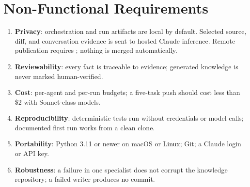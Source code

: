 \section{Non-Functional Requirements}

\begin{enumerate}[label=NFR\arabic*., leftmargin=3.5em, nosep]
  \item \textbf{Privacy}: orchestration and run artifacts are local by default. Selected source, diff, and conversation evidence is sent to hosted Claude inference. Remote publication requires ; nothing is merged automatically.
  \item \textbf{Reviewability}: every fact is traceable to evidence; generated knowledge is never marked human-verified.
  \item \textbf{Cost}: per-agent and per-run budgets; a five-task push should cost less than \$2 with Sonnet-class models.
  \item \textbf{Reproducibility}: deterministic tests run without credentials or model calls; documented first run works from a clean clone.
  \item \textbf{Portability}: Python 3.11 or newer on macOS or Linux; Git; a Claude login or API key.
  \item \textbf{Robustness}: a failure in one specialist does not corrupt the knowledge repository; a failed writer produces no commit.
\end{enumerate}
